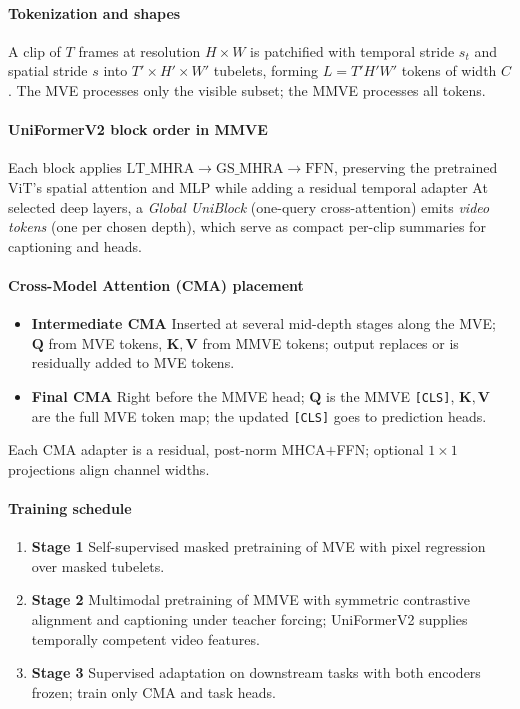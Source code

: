 \begin{enrichment}
\begin{enrichment}
        \paragraph{Tokenization and shapes}
        A clip of \(T\) frames at resolution \(H{\times}W\) is patchified with temporal stride \(s_t\) and spatial stride \(s\) into \(T'\!\times\!H'\!\times\!W'\) tubelets, forming \(L=T'H'W'\) tokens of width \(C\).
        The MVE processes only the visible subset; the MMVE processes all tokens.
        
        \paragraph{UniFormerV2 block order in MMVE}
        Each block applies \(\text{LT\_MHRA} \rightarrow \text{GS\_MHRA} \rightarrow \text{FFN}\), preserving the pretrained ViT’s spatial attention and MLP while adding a residual temporal adapter
        At selected deep layers, a \emph{Global UniBlock} (one-query cross-attention) emits \emph{video tokens} (one per chosen depth), which serve as compact per-clip summaries for captioning and heads.
        
        \paragraph{Cross-Model Attention (CMA) placement}
        \begin{itemize}
            \item \textbf{Intermediate CMA} Inserted at several mid-depth stages along the MVE; \(\bm{Q}\) from MVE tokens, \(\bm{K},\bm{V}\) from MMVE tokens; output replaces or is residually added to MVE tokens.
            \item \textbf{Final CMA} Right before the MMVE head; \(\bm{Q}\) is the MMVE \texttt{[CLS]}, \(\bm{K},\bm{V}\) are the full MVE token map; the updated \texttt{[CLS]} goes to prediction heads.
        \end{itemize}
        Each CMA adapter is a residual, post-norm MHCA\(+\)FFN; optional \(1{\times}1\) projections align channel widths.
        
        \paragraph{Training schedule}
        \begin{enumerate}
            \item \textbf{Stage 1} Self-supervised masked pretraining of MVE with pixel regression over masked tubelets.
            \item \textbf{Stage 2} Multimodal pretraining of MMVE with symmetric contrastive alignment and captioning under teacher forcing; UniFormerV2 supplies temporally competent video features.
            \item \textbf{Stage 3} Supervised adaptation on downstream tasks with both encoders frozen; train only CMA and task heads.
        \end{enumerate}
        

\end{enrichment}
\end{enrichment}
